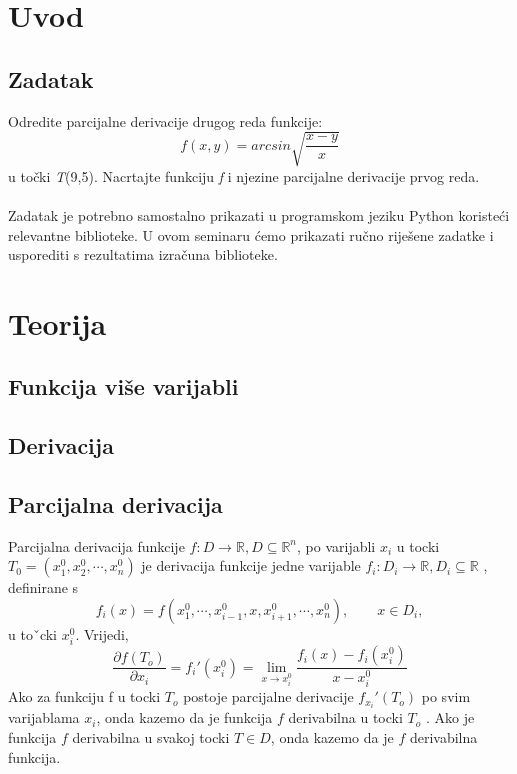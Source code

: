 \documentclass{article}
\begin{document}
\tableofcontents

\pagebreak

\section{Uvod}

\subsection{Zadatak}
Odredite parcijalne derivacije drugog reda funkcije:
$$
f(x,y) = arcsin \sqrt{\frac{x-y}{x}}
$$
u točki \textit{T}(9,5). Nacrtajte funkciju \textit{f} i njezine parcijalne derivacije prvog reda.
\\~\\
Zadatak je potrebno samostalno prikazati u programskom jeziku Python koristeći relevantne biblioteke. U ovom seminaru ćemo prikazati ručno riješene zadatke i usporediti s rezultatima izračuna biblioteke.

\pagebreak

\section{Teorija}

\subsection{Funkcija više varijabli}

\subsection{Derivacija}

\subsection{Parcijalna derivacija}

Parcijalna derivacija funkcije $f:D\rightarrow \mathbb{R} , D \subseteq \mathbb{R}^n$, po varijabli $x_i$
u tocki $T_0=(x_1^0, x_2^0,\cdots , x_n^0)$ je derivacija funkcije jedne varijable
$f_i:D_i \rightarrow \mathbb{R} , D_i \subseteq \mathbb{R}$ , definirane s
 $$f_i(x)=f(x_1^0, \cdots , x_{i-1}^0, x, x_{i+1}^0,\cdots , x_n^0), \quad \quad x \in D_i ,$$ u toˇcki $x_i^0$. Vrijedi,
\begin{equation*}
    \frac{\partial f (T_o)}{\partial x_i}=f_i '(x_i^0)=\displaystyle{\lim_{x \to x_i^0}}\frac{f_i(x)-f_i(x_i^0)}{x-x_i^0}
\end{equation*}
Ako za funkciju f u tocki $T_o$ postoje parcijalne derivacije $f_{x_i} '(T_o)$ po svim varijablama $x_i$, onda kazemo da je funkcija $f$ derivabilna
u tocki $T_o$ . Ako je funkcija $f$ derivabilna u svakoj tocki $T \in D$, onda kazemo da je $f$ derivabilna funkcija.
\end{document}
